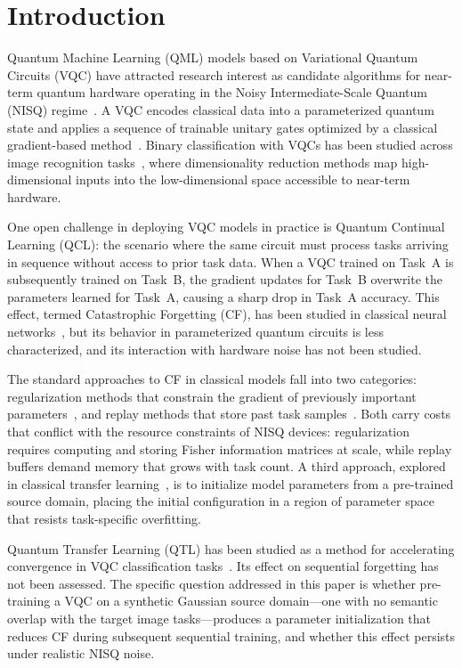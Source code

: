 \documentclass[10pt,conference]{IEEEtran}
\begin{document}
\section{Introduction}

Quantum Machine Learning (QML) models based on Variational Quantum
Circuits (VQC) have attracted research interest as candidate algorithms
for near-term quantum hardware operating in the Noisy
Intermediate-Scale Quantum (NISQ) regime~\cite{preskill2018quantum}.
A VQC encodes classical data into a parameterized quantum state and
applies a sequence of trainable unitary gates optimized by a classical
gradient-based method~\cite{cerezo2021variational,mitarai2018quantum}.
Binary classification with VQCs has been studied across image
recognition tasks~\cite{schuld2019evaluating}, where dimensionality
reduction methods map high-dimensional inputs into the low-dimensional
space accessible to near-term hardware.

One open challenge in deploying VQC models in practice is Quantum
Continual Learning (QCL): the scenario where the same circuit must
process tasks arriving in sequence without access to prior task data.
When a VQC trained on Task~A is subsequently trained on Task~B, the
gradient updates for Task~B overwrite the parameters learned for
Task~A, causing a sharp drop in Task~A accuracy. This effect, termed
Catastrophic Forgetting (CF), has been studied in classical neural
networks~\cite{parisi2019continual,kirkpatrick2017overcoming}, but its
behavior in parameterized quantum circuits is less characterized,
and its interaction with hardware noise has not been studied.

The standard approaches to CF in classical models fall into two
categories: regularization methods that constrain the gradient of
previously important parameters~\cite{kirkpatrick2017overcoming}, and
replay methods that store past task samples~\cite{buzzega2020dark}.
Both carry costs that conflict with the resource constraints of NISQ
devices: regularization requires computing and storing Fisher
information matrices at scale, while replay buffers demand memory that
grows with task count. A third approach, explored in classical transfer
learning~\cite{pan2009survey}, is to initialize model parameters from
a pre-trained source domain, placing the initial configuration in a
region of parameter space that resists task-specific overfitting.

Quantum Transfer Learning (QTL) has been studied as a method for
accelerating convergence in VQC classification
tasks~\cite{mari2020transfer}. Its effect on sequential forgetting has
not been assessed. The specific question addressed in this
paper is whether pre-training a VQC on a synthetic Gaussian source
domain---one with no semantic overlap with the target image
tasks---produces a parameter initialization that reduces CF during
subsequent sequential training, and whether this effect persists under
realistic NISQ noise.
\end{document}
